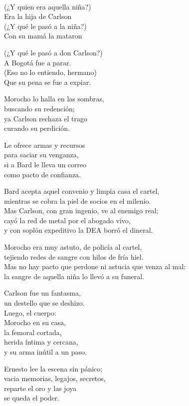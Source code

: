\begin{lyrics}
\\
 (¿Y quien era aquella niña?)\\
 Era la hija de Carlson\\
 (¿Y qué le pasó a la niña?)\\
 Con su mamá la mataron

 (¿Y qué le pasó a don Carlson?)\\
 A Bogotá fue a parar.\\
 (Eso no lo entiendo, hermano)\\
 Que su pena se fue a expiar.

Morocho lo halla en las sombras,\\
buscando su redención;\\
ya Carlson rechaza el trago\\
curando su perdición.

Le ofrece armas y recursos\\
para saciar su venganza,\\
si a Bard le lleva un correo\\
como pacto de confianza.

Bard acepta aquel convenio y limpia casa el cartel,\\
mientras se cobra la piel de socios en el milenio.\\
Mas Carlson, con gran ingenio, ve al enemigo real;\\
cayó la red de metal por el abogado vivo,\\
y con soplón expeditivo la DEA borró el dineral.

Morocho era muy astuto, de policía al cartel,\\
tejiendo redes de sangre con hilos de fría hiel.\\
Mas no hay pacto que perdone ni astucia que venza al mal:\\
la sangre de aquella niña lo llevó a su funeral.

Carlson fue un fantasma,\\
un destello que se deshizo.\\
Luego, el cuerpo:\\
Morocho en su casa,\\
la femoral cortada,\\
herida íntima y cercana,\\
y su arma inútil a un paso.

Ernesto lee la escena sin pánico;\\
vacia memorias, legajos, secretos,\\
reparte el oro y las joya\\
se queda el poder.


\end{lyrics}

